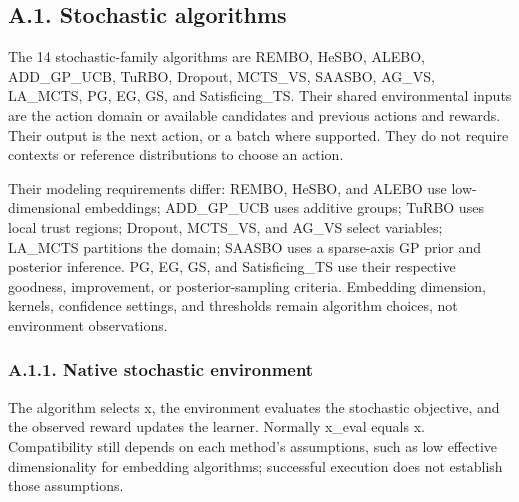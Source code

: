 \documentclass[10pt,a4paper]{article}
\begin{document}
\subsection*{A.1. Stochastic algorithms}

The 14 stochastic-family algorithms are REMBO,\allowbreak{} HeSBO,\allowbreak{} ALEBO,\allowbreak{} ADD\_\allowbreak{}GP\_\allowbreak{}UCB,\allowbreak{} TuRBO,\allowbreak{} Dropout,\allowbreak{} MCTS\_\allowbreak{}VS,\allowbreak{} SAASBO,\allowbreak{} AG\_\allowbreak{}VS,\allowbreak{} LA\_\allowbreak{}MCTS,\allowbreak{} PG,\allowbreak{} EG,\allowbreak{} GS,\allowbreak{} and Satisficing\_\allowbreak{}TS. Their shared environmental inputs are the action domain or available candidates and previous actions and rewards. Their output is the next action,\allowbreak{} or a batch where supported. They do not require contexts or reference distributions to choose an action.


Their modeling requirements differ: REMBO,\allowbreak{} HeSBO,\allowbreak{} and ALEBO use low-dimensional embeddings; ADD\_\allowbreak{}GP\_\allowbreak{}UCB uses additive groups; TuRBO uses local trust regions; Dropout,\allowbreak{} MCTS\_\allowbreak{}VS,\allowbreak{} and AG\_\allowbreak{}VS select variables; LA\_\allowbreak{}MCTS partitions the domain; SAASBO uses a sparse-axis GP prior and posterior inference. PG,\allowbreak{} EG,\allowbreak{} GS,\allowbreak{} and Satisficing\_\allowbreak{}TS use their respective goodness,\allowbreak{} improvement,\allowbreak{} or posterior-sampling criteria. Embedding dimension,\allowbreak{} kernels,\allowbreak{} confidence settings,\allowbreak{} and thresholds remain algorithm choices,\allowbreak{} not environment observations.


\subsubsection*{A.1.1. Native stochastic environment}

The algorithm selects x,\allowbreak{} the environment evaluates the stochastic objective,\allowbreak{} and the observed reward updates the learner. Normally x\_\allowbreak{}eval equals x. Compatibility still depends on each method's assumptions,\allowbreak{} such as low effective dimensionality for embedding algorithms; successful execution does not establish those assumptions.
\end{document}
